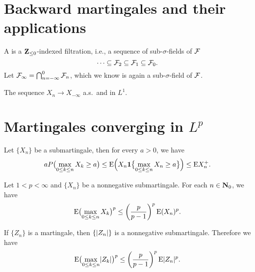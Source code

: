\section{Backward martingales and their applications}
\begin{defn}
    A  is a $\mathbf{Z}_{\leq 0}$-indexed filtration, i.e., a sequence of sub-$\sigma$-fields of $\mathcal{F}$ \[
        \dotsb\subseteq \mathcal{F}_2 \subseteq \mathcal{F}_1 \subseteq \mathcal{F}_0.
    \] Let $\mathcal{F}_\infty = \bigcap_{n=-\infty}^0 \mathcal{F}_n$, which we know is again a sub-$\sigma$-field of $\mathcal{F}$.
\end{defn}

\begin{namedthm}
    The sequence $X_n \to X_{-\infty}$ a.s.\ and in $L^1$.
\end{namedthm}

\begin{exa}
    
\end{exa}

\begin{exa}
    
\end{exa}

\section{Martingales converging in \texorpdfstring{$L^p$}{Lp}}

\begin{namedthm}
    Let $\{X_n\}$ be a submartingale, then for every $a > 0$, we have \[
        a P\bigl(\max_{0\leq k \leq n} X_k \geq a\bigr) \leq \mathop{}\!\mathrm{E}\Bigl(X_n \mathbf{1}\bigl\{\max_{0\leq k \leq n}X_n \geq a\bigr\}\Bigr) \leq \mathop{}\!\mathrm{E} X_n^+.
    \]
\end{namedthm}

\begin{namedthm}
    Let $1 < p < \infty$ and $\{X_n\}$ be a nonnegative submartingale. For each $n\in \mathbf{N}_0$, we have \[
        \mathop{}\!\mathrm{E} \bigl(\max_{0\leq k \leq n} X_k\bigr)^p \leq \biggl(\frac{p}{p-1}\biggr)^p \mathop{}\!\mathrm{E}(X_n)^p.
    \]
\end{namedthm}


\begin{cor}
    If $\{Z_n\}$ is a martingale, then $\{\lvert Z_n \rvert\}$ is a nonnegative submartingale. Therefore we have \[
        \mathop{}\!\mathrm{E} \bigl(\max_{0\leq k \leq n} \lvert Z_k \rvert\bigr)^p \leq \biggl(\frac{p}{p-1}\biggr)^p \mathop{}\!\mathrm{E}\lvert Z_n \rvert^p.
    \]
\end{cor}


